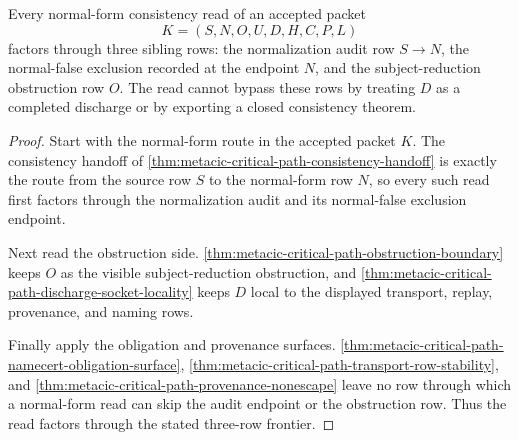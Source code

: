 \begin{theorem}
\label{thm:metacic-critical-path-normalization-frontier-factorization}
Every normal-form consistency read of an accepted packet
$$
K=(S,N,O,U,D,H,C,P,L)
$$
factors through three sibling rows: the normalization audit row $S \to N$, the normal-false exclusion recorded at the endpoint $N$, and the subject-reduction obstruction row $O$. The read cannot bypass these rows by treating $D$ as a completed discharge or by exporting a closed consistency theorem.
\end{theorem}
\begin{proof}
Start with the normal-form route in the accepted packet $K$. The consistency handoff of \autoref{thm:metacic-critical-path-consistency-handoff} is exactly the route from the source row $S$ to the normal-form row $N$, so every such read first factors through the normalization audit and its normal-false exclusion endpoint.

Next read the obstruction side. \autoref{thm:metacic-critical-path-obstruction-boundary} keeps $O$ as the visible subject-reduction obstruction, and \autoref{thm:metacic-critical-path-discharge-socket-locality} keeps $D$ local to the displayed transport, replay, provenance, and naming rows.

Finally apply the obligation and provenance surfaces. \autoref{thm:metacic-critical-path-namecert-obligation-surface}, \autoref{thm:metacic-critical-path-transport-row-stability}, and \autoref{thm:metacic-critical-path-provenance-nonescape} leave no row through which a normal-form read can skip the audit endpoint or the obstruction row. Thus the read factors through the stated three-row frontier.
\end{proof}

